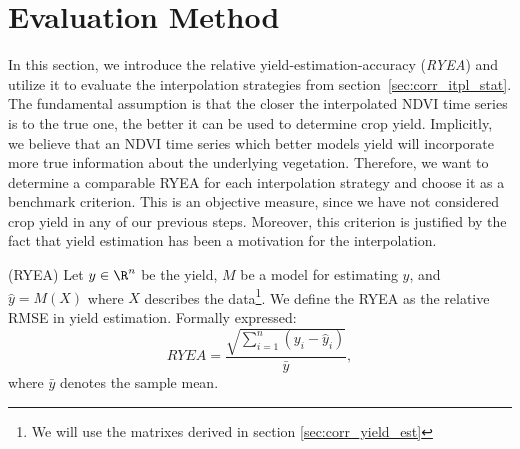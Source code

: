 \section{Evaluation Method}{
    \label{sec:ndvi_corr_eval}
    In this section, we introduce the relative yield-estimation-accuracy (\textit{RYEA}) and utilize it to evaluate the interpolation strategies from section~\ref{sec:corr_itpl_stat}. 
    The fundamental assumption is that the closer the interpolated NDVI time series is to the true one, the better it can be used to determine crop yield. Implicitly, we believe that an NDVI time series which better models yield will incorporate more true information about the underlying vegetation. 
    Therefore, we want to determine a comparable RYEA for each interpolation strategy and choose it as a benchmark criterion. 
    This is an objective measure, since we have not considered crop yield in any of our previous steps. Moreover, this criterion is justified by the fact that yield estimation has been a motivation for the interpolation.

    \begin{definition}(RYEA) \label{def:ryea}
        Let $y\in \R^n$ be the yield, $M$ be a model for estimating $y$, and $\hat y = M(X)$ where $X$ describes the data\footnote{We will use the matrixes derived in section \ref{sec:corr_yield_est}}. 
        We define the RYEA as the relative RMSE in yield estimation. Formally expressed:
        \begin{equation}
            RYEA = \frac{\sqrt{\sum_{i=1}^n(y_i - \hat y_i)}}{\bar y}, %
        \end{equation}
        where $\bar y$ denotes the sample mean.
    \end{definition}

}
